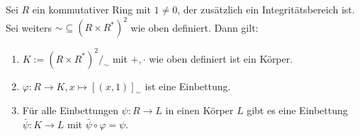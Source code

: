 \begin{theorem}\label{theorem:Quotientenkoerper}
    Sei $R$ ein kommutativer Ring mit $1 \neq 0$, der zusätzlich ein Integritätsbereich ist. Sei weiters $\sim \subseteq (R \times R^*)^2$ wie oben definiert. Dann gilt:
    \begin{enumerate}
        \item $K := (R \times R^*)^2/_\sim $ mit $+, \cdot$ wie oben definiert ist ein Körper.
        \item $\varphi : R \to K, x \mapsto [(x, 1)]_\sim$ ist eine Einbettung.
        \item Für alle Einbettungen $\psi : R \to L$ in einen Körper $L$ gibt es eine Einbettung $\bar{\psi} : K \to L$ mit $\bar{\psi} \circ \varphi = \psi$.
    \end{enumerate}
\end{theorem}

